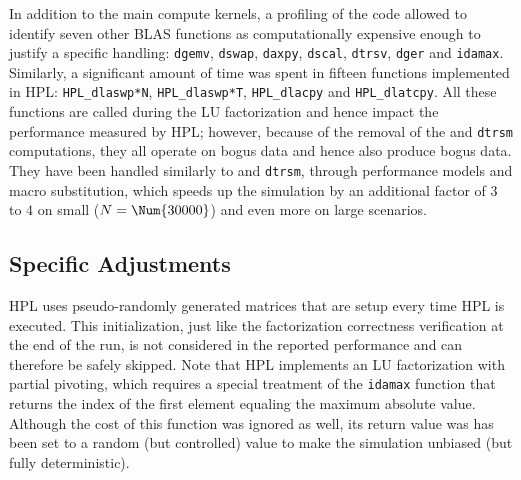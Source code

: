             In addition to the main compute kernels, a profiling of the code allowed to identify seven other BLAS functions
            as computationally expensive enough to justify a specific handling: \texttt{dgemv}, \texttt{dswap},
            \texttt{daxpy}, \texttt{dscal}, \texttt{dtrsv}, \texttt{dger} and \texttt{idamax}. Similarly, a significant
            amount of time was spent in fifteen functions implemented in HPL: \texttt{HPL\_dlaswp*N},
            \texttt{HPL\_dlaswp*T}, \texttt{HPL\_dlacpy} and \texttt{HPL\_dlatcpy}.  All these functions are called during
            the LU factorization and hence impact the performance measured by HPL; however, because of the removal of the
            \dgemm and \texttt{dtrsm} computations, they all operate on bogus data and hence also produce bogus
            data. They have been handled similarly to \dgemm and \texttt{dtrsm}, through performance models and
            macro substitution, which speeds up the simulation by an additional factor of \(3\) to \(4\) on small
            (\(N=\Num{30000}\)) and even more on large scenarios.

        \subsection{Specific Adjustments}
            HPL uses pseudo-randomly generated matrices that are setup every time HPL is executed. This initialization, just
            like the factorization correctness verification at the end of the run, is not considered in the reported
            performance and can therefore be safely skipped.  Note that HPL implements an LU factorization with partial
            pivoting, which requires a special treatment of the \texttt{idamax} function that returns the index of the first
            element equaling the maximum absolute value. Although the cost of this function was ignored as well, its return
            value was has been set to a random (but controlled) value to make the simulation unbiased (but fully
            deterministic).

